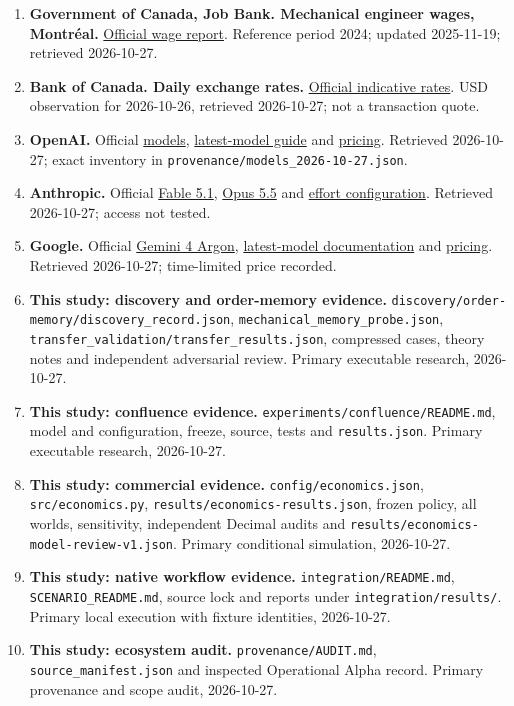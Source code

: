 \documentclass[
  11pt,
]{article}
\begin{document}
\begin{enumerate}
  because online and issue dates differ.
\item
  \textbf{Government of Canada, Job Bank. Mechanical engineer wages,
  Montréal.}
  \href{https://www.jobbank.gc.ca/marketreport/wages-occupation/2757/22447}{Official
  wage report}. Reference period 2024; updated 2025-11-19; retrieved
  2026-10-27.
\item
  \textbf{Bank of Canada. Daily exchange rates.}
  \href{https://www.bankofcanada.ca/rates/exchange/daily-exchange-rates/}{Official
  indicative rates}. USD observation for 2026-10-26, retrieved
  2026-10-27; not a transaction quote.
\item
  \textbf{OpenAI.} Official
  \href{https://developers.openai.com/api/docs/models}{models},
  \href{https://developers.openai.com/api/docs/guides/latest-model}{latest-model
  guide} and
  \href{https://developers.openai.com/api/docs/pricing}{pricing}.
  Retrieved 2026-10-27; exact inventory in
  \nolinkurl{provenance/models_2026-10-27.json}.
\item
  \textbf{Anthropic.} Official
  \href{https://platform.claude.com/docs/en/models/fable-5-1/overview}{Fable
  5.1},
  \href{https://platform.claude.com/docs/en/models/opus-5-5/overview}{Opus
  5.5} and
  \href{https://platform.claude.com/docs/en/build-with-claude/effort}{effort
  configuration}. Retrieved 2026-10-27; access not tested.
\item
  \textbf{Google.} Official
  \href{https://ai.google.dev/gemini-api/docs/models/gemini-4-argon}{Gemini
  4 Argon},
  \href{https://ai.google.dev/gemini-api/docs/latest-model}{latest-model
  documentation} and
  \href{https://ai.google.dev/gemini-api/docs/pricing}{pricing}.
  Retrieved 2026-10-27; time-limited price recorded.
\item
  \textbf{This study: discovery and order-memory evidence.}
  \nolinkurl{discovery/order-memory/discovery_record.json},
  \texttt{mechanical\_memory\_probe.json},
  \nolinkurl{transfer_validation/transfer_results.json}, compressed
  cases, theory notes and independent adversarial review. Primary
  executable research, 2026-10-27.
\item
  \textbf{This study: confluence evidence.}
  \nolinkurl{experiments/confluence/README.md}, model and configuration,
  freeze, source, tests and \texttt{results.json}. Primary executable
  research, 2026-10-27.
\item
  \textbf{This study: commercial evidence.}
  \nolinkurl{config/economics.json}, \nolinkurl{src/economics.py},
  \nolinkurl{results/economics-results.json}, frozen policy, all worlds,
  sensitivity, independent Decimal audits and
  \nolinkurl{results/economics-model-review-v1.json}. Primary conditional
  simulation, 2026-10-27.
\item
  \textbf{This study: native workflow evidence.}
  \nolinkurl{integration/README.md}, \texttt{SCENARIO\_README.md}, source
  lock and reports under \nolinkurl{integration/results/}. Primary local
  execution with fixture identities, 2026-10-27.
\item
  \textbf{This study: ecosystem audit.} \nolinkurl{provenance/AUDIT.md},
  \texttt{source\_manifest.json} and inspected Operational Alpha record.
  Primary provenance and scope audit, 2026-10-27.
\end{enumerate}
\end{document}
